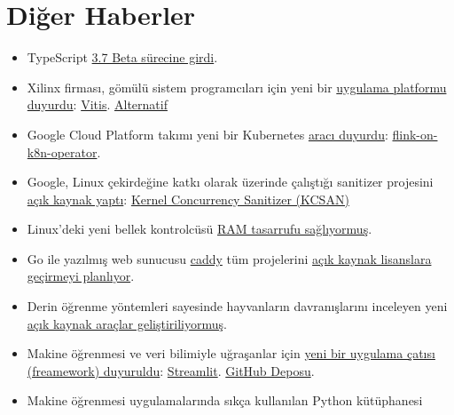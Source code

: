 \documentclass[11pt]{article}
\begin{document}
\section{Diğer Haberler}
\label{sec:org472eeaf}
\begin{itemize}
\item TypeScript \href{https://devblogs.microsoft.com/typescript/announcing-typescript-3-7-beta/}{3.7 Beta sürecine girdi}.
\item Xilinx firması, gömülü sistem programcıları için yeni bir \href{https://www.xilinx.com/news/press/2019/xilinx-announces-vitis--a-unified-software-platform-unlocking-a-new-design-experience-for-all-developers.html}{uygulama platformu
duyurdu}: \href{https://www.xilinx.com/products/design-tools/vitis.html}{Vitis}. \href{https://www.eejournal.com/article/xilinx-vitis-and-vitis-ai-software-development-platforms/}{Alternatif}
\item Google Cloud Platform takımı yeni bir Kubernetes \href{https://www.ververica.com/blog/google-cloud-platforms-flink-operator-for-kubernetes}{aracı duyurdu}:
\href{https://github.com/GoogleCloudPlatform/flink-on-k8s-operator}{flink-on-k8n-operator}.
\item Google, Linux çekirdeğine katkı olarak üzerinde çalıştığı sanitizer
projesini \href{https://www.phoronix.com/scan.php?page=news\_item\&px=Google-KCSAN-Sanitizer}{açık kaynak yaptı}: \href{https://github.com/google/ktsan}{Kernel Concurrency Sanitizer (KCSAN)}
\item Linux'deki yeni bellek kontrolcüsü \href{https://thenewstack.io/a-new-linux-memory-controller-promises-to-save-lots-of-ram/}{RAM tasarrufu sağlıyormuş}.
\item Go ile yazılmış web sunucusu \href{https://github.com/caddyserver/caddy}{caddy} tüm projelerini \href{https://github.com/caddyserver/caddy/issues/2786}{açık kaynak lisanslara
geçirmeyi planlıyor}.
\item Derin öğrenme yöntemleri sayesinde hayvanların davranışlarını inceleyen yeni
\href{https://www.nature.com/articles/d41586-019-02942-5}{açık kaynak araçlar geliştiriliyormuş}.
\item Makine öğrenmesi ve veri bilimiyle uğraşanlar için \href{https://towardsdatascience.com/coding-ml-tools-like-you-code-ml-models-ddba3357eace}{yeni bir uygulama çatısı
(freamework) duyuruldu}: \href{https://streamlit.io/}{Streamlit}. \href{https://github.com/streamlit/streamlit}{GitHub Deposu}.
\item Makine öğrenmesi uygulamalarında sıkça kullanılan Python kütüphanesi

\end{itemize}
\end{document}
